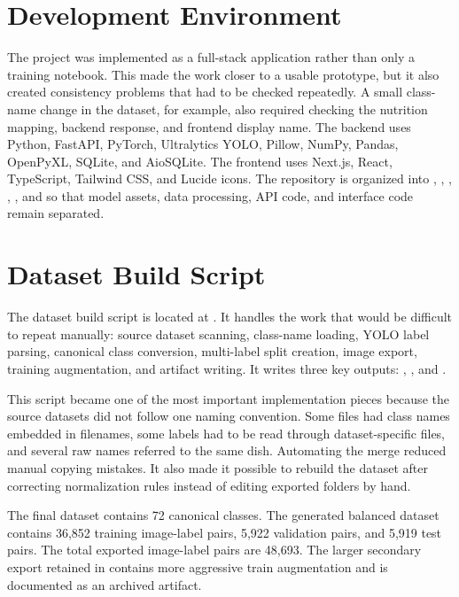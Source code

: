 
\section{Development Environment}

The project was implemented as a full-stack application rather than only a training notebook. This made the work closer to a usable prototype, but it also created consistency problems that had to be checked repeatedly. A small class-name change in the dataset, for example, also required checking the nutrition mapping, backend response, and frontend display name. The backend uses Python, FastAPI, PyTorch, Ultralytics YOLO, Pillow, NumPy, Pandas, OpenPyXL, SQLite, and AioSQLite. The frontend uses Next.js, React, TypeScript, Tailwind CSS, and Lucide icons. The repository is organized into , , , , , and  so that model assets, data processing, API code, and interface code remain separated.

\section{Dataset Build Script}

The dataset build script is located at . It handles the work that would be difficult to repeat manually: source dataset scanning, class-name loading, YOLO label parsing, canonical class conversion, multi-label split creation, image export, training augmentation, and artifact writing. It writes three key outputs: , , and .

This script became one of the most important implementation pieces because the source datasets did not follow one naming convention. Some files had class names embedded in filenames, some labels had to be read through dataset-specific  files, and several raw names referred to the same dish. Automating the merge reduced manual copying mistakes. It also made it possible to rebuild the dataset after correcting normalization rules instead of editing exported folders by hand.

The final dataset contains 72 canonical classes. The generated balanced dataset contains 36,852 training image-label pairs, 5,922 validation pairs, and 5,919 test pairs. The total exported image-label pairs are 48,693. The larger secondary export retained in  contains more aggressive train augmentation and is documented as an archived artifact.

